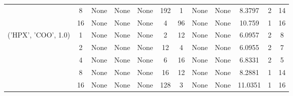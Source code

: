 \begin{tabular}{cccccccccccc}
& 8& None& None& None& 192& 1& None& None& 8.3797& 2& 14\\
& 16& None& None& None& 4& 96& None& None& 10.759& 1& 16\\
\hline
\multirow{5}{*}{('HPX', 'COO', 1.0)}& 1& None& None& None& 2& 12& None& None& 6.0957& 2& 8\\
& 2& None& None& None& 12& 4& None& None& 6.0955& 2& 7\\
& 4& None& None& None& 6& 16& None& None& 6.8331& 2& 5\\
& 8& None& None& None& 16& 12& None& None& 8.2881& 1& 14\\
& 16& None& None& None& 128& 3& None& None& 11.0351& 1& 16\\
\hline
\end{tabular}
